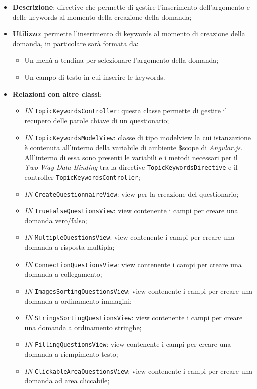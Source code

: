 \begin{itemize}
	\item \textbf{Descrizione}: directive che permette di gestire l'inserimento dell'argomento e delle keywords al momento della creazione della domanda;
	\item \textbf{Utilizzo}: permette l'inserimento di keywords al momento di creazione della domanda, in particolare sarà formata da:
	\begin{itemize}
		\item Un menù a tendina per selezionare l'argomento della domanda;
		\item Un campo di testo in cui inserire le keywords.
	\end{itemize}
	\item \textbf{Relazioni con altre classi}:
	\begin{itemize}
		\item \textit{IN} \texttt{TopicKeywordsController}: questa classe permette di gestire il recupero delle parole chiave di un questionario;
		\item \textit{IN} \texttt{TopicKeywordsModelView}: classe di tipo modelview la cui istanzazione è contenuta all'interno della variabile di ambiente \$scope di \textit{Angular.js}. All'interno di essa sono presenti le variabili e i metodi necessari per il \textit{Two-Way Data-Binding} tra la directive \texttt{TopicKeywordsDirective} e il controller \texttt{TopicKeywordsController};
		\item \textit{IN} \texttt{CreateQuestionnaireView}: view per la creazione del questionario; 
		\item \textit{IN} \texttt{TrueFalseQuestionsView}: view contenente i campi per creare una domanda vero/falso; 
		\item \textit{IN} \texttt{MultipleQuestionsView}: view contenente i campi per creare una domanda a risposta multipla;
		\item \textit{IN} \texttt{ConnectionQuestionsView}: view contenente i campi per creare una domanda a collegamento;
		\item \textit{IN} \texttt{ImagesSortingQuestionsView}: view contenente i campi per creare una domanda a ordinamento immagini;
		\item \textit{IN} \texttt{StringsSortingQuestionsView}: view contenente i campi per creare una domanda a ordinamento stringhe;
		\item \textit{IN} \texttt{FillingQuestionsView}: view contenente i campi per creare una domanda a riempimento testo;
		\item \textit{IN} \texttt{ClickableAreaQuestionsView}: view contenente i campi per creare una domanda ad area cliccabile;

\end{itemize}
\end{itemize}
